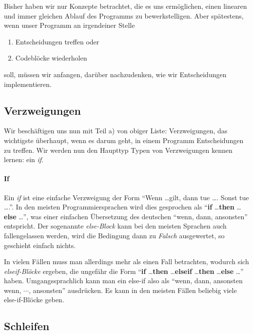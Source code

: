 
Bisher haben wir nur Konzepte betrachtet, die es uns ermöglichen, einen linearen und immer gleichen Ablauf des Programms zu bewerkstelligen. Aber spätestens, wenn unser Programm an irgendeiner Stelle
\begin{enumerate}[label = \alph*)]
	\item Entscheidungen treffen oder
	\item Codeblöcke wiederholen
\end{enumerate}
soll, müssen wir anfangen, darüber nachzudenken, wie wir Entscheidungen implementieren.

\subsection{Verzweigungen} \functionalMark \imperativeMark \oopMark

	Wir beschäftigen uns nun mit Teil a) von obiger Liste: Verzweigungen, das wichtigste überhaupt, wenn es darum geht, in einem Programm Entscheidungen zu treffen. Wir werden nun den Haupttyp Typen von Verzweigungen kennen lernen: ein \textit{if}.

	\paragraph{If}
		Ein \textit{if} ist eine einfache Verzweigung der Form \enquote{Wenn \dots gilt, dann tue \dots. Sonst tue \dots.}. In den meisten Programmiersprachen wird dies gesprochen als \enquote{\textbf{if} \dots \textbf{then} \dots \textbf{else} \dots}, was einer einfachen Übersetzung des deutschen \enquote{wenn, dann, ansonsten} entspricht. Der sogenannte \textit{else-Block} kann bei den meisten Sprachen auch fallengelassen werden, wird die Bedingung dann zu \textit{Falsch} ausgewertet, so geschieht einfach nichts.
		
		In vielen Fällen muss man allerdings mehr als einen Fall betrachten, wodurch sich \textit{elseif-Blöcke} ergeben, die ungefähr die Form \enquote{\textbf{if} \dots \textbf{then} \dots \textbf{elseif} \dots \textbf{then} \dots \textbf{else} \dots} haben. Umgangssprachlich kann man ein else-if also als \enquote{wenn, dann, ansonsten wenn, $ \cdots $, ansonsten} ausdrücken. Es kann in den meisten Fällen beliebig viele else-if-Blöcke geben.

\subsection{Schleifen} \imperativeMark \oopMark

